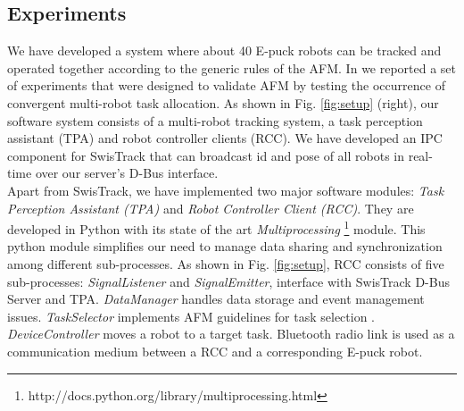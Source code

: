 \documentclass{ifacconf}
\begin{document}
\subsection{Experiments}
We have developed a system where about 40 E-puck robots can be tracked and operated together according to the generic rules of the AFM. In \cite{Sarker+2010ants} we reported a set of experiments that were designed to validate AFM by testing the occurrence of convergent multi-robot task allocation.  As shown in Fig. \ref{fig:setup} (right), our software system consists of a multi-robot tracking system, a task perception assistant (TPA) and robot controller clients (RCC). We have developed an IPC component for SwisTrack that can broadcast id and pose of all robots in real-time over our server's D-Bus interface.\\
Apart from SwisTrack, we have implemented two major software modules: {\em Task Perception Assistant (TPA)} and {\em Robot Controller Client (RCC)}. They are developed in Python with its state of the art \textit{Multiprocessing} \footnote{http://docs.python.org/library/multiprocessing.html} module. This python module simplifies our need to manage data sharing and synchronization among different sub-processes. As shown in Fig. \ref{fig:setup}, RCC consists of five sub-processes: {\em SignalListener} and {\em SignalEmitter}, interface with SwisTrack D-Bus Server and TPA. {\em DataManager} handles data storage and event management issues. {\em TaskSelector} implements AFM guidelines for task selection . {\em DeviceController} moves a robot to a target task. Bluetooth radio link is used as a communication medium between a RCC and a corresponding E-puck robot.  
\end{document}
